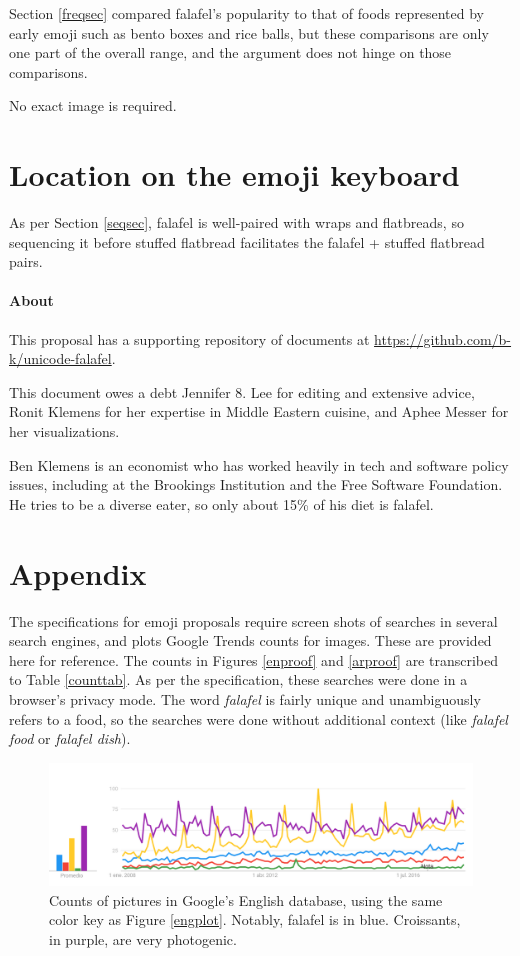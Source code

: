 \documentclass[a4paper,10pt]{article}
\begin{document}
Section \ref{freqsec} compared falafel's popularity to that of foods represented by early
emoji such as bento boxes and rice balls, but these comparisons are only one part of the
overall range, and the argument does not hinge on those comparisons.

No exact image is required.

\section{Location on the emoji keyboard}

As per Section \ref{seqsec}, falafel is well-paired with wraps and flatbreads, so 
sequencing it before {\sc stuffed flatbread}
facilitates the {\sc falafel} + {\sc stuffed flatbread} pairs.

\vfill
{\small \paragraph{About}
This proposal has a supporting repository of documents at 
\url{https://github.com/b-k/unicode-falafel}.

This document owes a debt Jennifer 8. Lee for editing and extensive
advice, Ronit Klemens for her expertise in Middle Eastern cuisine,
and Aphee Messer for her visualizations.

Ben Klemens is an economist who has worked heavily in tech and software policy issues,
including at the Brookings Institution and the Free Software Foundation. He tries to
be a diverse eater, so only about 15\% of his diet is falafel.
}

\eject
\section*{Appendix}
The specifications for emoji proposals require screen shots of searches in several
search engines, and plots Google Trends counts for images. These are provided here
for reference. The counts in Figures \ref{enproof} and \ref{arproof} are transcribed
to Table \ref{counttab}. As per the specification, these searches were done
in a browser's privacy mode. The word {\em falafel} is fairly unique and unambiguously
refers to a food, so the searches were done without additional context (like {\em
falafel food} or {\em falafel dish}).


\begin{figure}[!hb]
\begin{center}
\includegraphics[width=4.8in]{etrends-pics.png}
\end{center}
\caption{Counts of pictures in Google's English database, using the same color key as
Figure \ref{engplot}. Notably, falafel is in blue. Croissants, in purple, are very photogenic.}
\label{engpicplot}
\end{figure}
\end{document}
